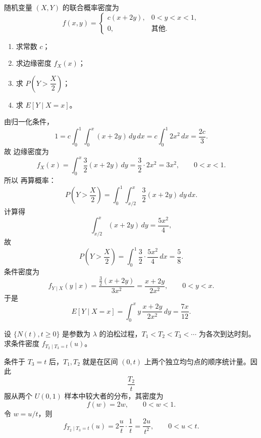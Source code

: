 \begin{question}
随机变量 $(X,Y)$ 的联合概率密度为
\[
f(x,y)=\begin{cases}
 c(x+2y),&0<y<x<1,\\
 0,&\text{其他}.
\end{cases}
\]
\begin{enumerate}
\item 求常数 $c$；
\item 求边缘密度 $f_X(x)$；
\item 求 $P\!\left(Y>\dfrac{X}{2}\right)$；
\item 求 $E[Y\mid X=x]$。
\end{enumerate}
\begin{solution}
由归一化条件，
\[
1=c\int_0^1\int_0^x (x+2y)\,dy\,dx
=c\int_0^1 2x^2\,dx
=\frac{2c}{3}.
\]
故
边缘密度为
\[
f_X(x)=\int_0^x \frac32(x+2y)\,dy
=\frac32\cdot 2x^2=3x^2,
\qquad 0<x<1.
\]
所以
再算概率：
\[
P\!\left(Y>\frac X2\right)=\int_0^1\int_{x/2}^{x}\frac32(x+2y)\,dy\,dx.
\]
计算得
\[
\int_{x/2}^{x}(x+2y)\,dy=\frac{5x^2}{4},
\]
故
\[
P\!\left(Y>\frac X2\right)=\int_0^1 \frac32\cdot \frac{5x^2}{4}\,dx=\frac58.
\]
条件密度为
\[
f_{Y\mid X}(y\mid x)=\frac{\frac32(x+2y)}{3x^2}=\frac{x+2y}{2x^2},
\qquad 0<y<x.
\]
于是
\[
E[Y\mid X=x]=\int_0^x y\,\frac{x+2y}{2x^2}\,dy=\frac{7x}{12}.
\]
\end{solution}
\end{question}

\begin{question}
设 $\{N(t),t\ge 0\}$ 是参数为 $\lambda$ 的泊松过程，$T_1<T_2<T_3<\cdots$ 为各次到达时刻。求条件密度 $f_{T_2\mid T_3=t}(u)$。
\begin{solution}
条件于 $T_3=t$ 后，$T_1,T_2$ 就是在区间 $(0,t)$ 上两个独立均匀点的顺序统计量。因此
\[
\frac{T_2}{t}
\]
服从两个 $U(0,1)$ 样本中较大者的分布，其密度为
\[
f(w)=2w,
\qquad 0<w<1.
\]
令 $w=u/t$，则
\[
f_{T_2\mid T_3=t}(u)=2\frac{u}{t}\cdot \frac1t
=\frac{2u}{t^2},
\qquad 0<u<t.
\]
\end{solution}
\end{question}

